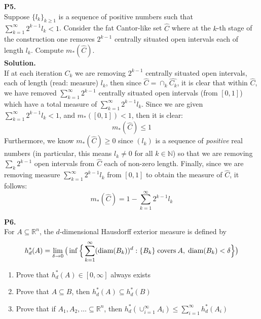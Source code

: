 \documentclass{article}
\begin{document}
    \textbf{P5.} \\

    Suppose $\{l_k\}_{k\geq 1}$ is a sequence of positive numbers such that \\$\sum_{k=1}^{\infty} 2^{k-1}l_k < 1$. Consider the
    fat Cantor-like set $\hat{C}$ where at the $k$-th stage of the construction one removes $2^{k-1}$ centrally situated open intervals
    each of length $l_k$. Compute $m_*(\hat{C})$.\\

    \textbf{Solution.}\\

    If at each iteration $C_k$ we are removing $2^{k-1}$ centrally situated open intervals, each of length (read: measure) $l_k$, 
    then since $\hat{C} = \cap_k \hat{C_k}$, it is clear that within $\hat{C}$, we have removed $\sum_{k=1}^{\infty} 2^{k-1}$ 
    centrally situated open intervals (from $[0,1]$) which have a total measure of $\sum_{k=1}^{\infty} 2^{k-1}l_k$. Since we are given 
    $\sum_{k=1}^{\infty} 2^{k-1}l_k < 1$, and $m_*([0,1])<1$, then it is clear:
    \[ m_*(\hat{C}) \leq 1 \]
    Furthermore, we know $m_*(\hat{C}) \geq 0$ since $(l_k)$ is a sequence of \textit{positive} real numbers (in particular, this means
    $l_k\neq 0$ for all $k\in\mathbb{N}$) so that we are removing $\sum_k 2^{k-1}$ open intervals from $\hat{C}$ each of non-zero
    length. Finally, since we are removing measure $\sum_{k=1}^{\infty} 2^{k-1}l_k$ from $[0,1]$ to obtain the measure of $\hat{C}$,
    it follows:
    \[ m_*(\hat{C}) = 1 - \sum_{k=1}^{\infty} 2^{k-1}l_k \]

    \textbf{P6.} \\

    For $A\subseteq\mathbb{R}^n$, the $d$-dimensional Hausdorff exterior measure is defined by
    \[ h_d^*(A) = \lim_{\delta\to 0}\big{(}\inf\Big{\{}\sum_{k=1}^{\infty} (\text{diam}(B_k))^d: \{B_k\}\;\text{covers}\: A,\;
        \text{diam}(B_k) < \delta\Big{\}}\big{)} \]
    \begin{enumerate}
        \item Prove that $h_d^*(A)\in[0,\infty]$ always exists
        \item Prove that $A\subseteq B$, then $h_d^*(A)\subseteq h_d^*(B)$
        \item Prove that if $A_1,A_2,\hdots\subseteq\mathbb{R}^n$, then $h_d^*(\cup_{i=1}^{\infty} A_i) \leq \sum_{i=1}^{\infty} 
            h_d^*(A_i)$
    \end{enumerate}
\end{document}
